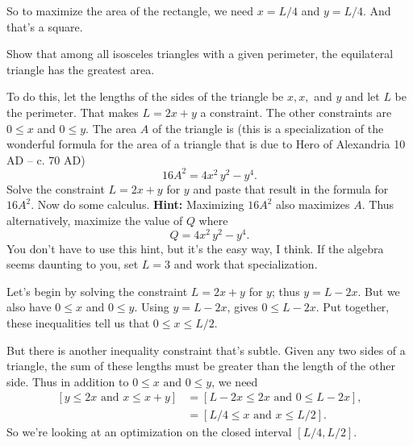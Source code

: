 \documentclass[12pt,fleqn,answers]{exam}
\begin{document}
\begin{questions}
\begin{solution}
     \quad So to maximize the area of the rectangle, we need $x = L/4$ and $y = L/4$. And that's a square.
     
     \end{solution}


    \question [5] Show that among all isosceles triangles with a given
    perimeter, the equilateral triangle has the greatest area.

    \quad To do this, let the lengths of the sides of the triangle be $x,x,$
    and $y$ and let $L$ be the perimeter. That makes $L = 2 x + y$ a
    constraint. The other constraints are $0 \leq x$ and $0 \leq y$.
    The area $A$ of the triangle is (this is a specialization of 
    the wonderful formula for the area of a triangle that is due to Hero of Alexandria 
    10 AD – c. 70 AD)
    \begin{equation*}
        16 {{A}^{2}}=4 {{x}^{2}}\, {{y}^{2}}-{{y}^{4}}.
    \end{equation*}
    Solve the constraint $L = 2 x + y$ for $y$ and paste that
    result in  the formula for $16 A^2$. Now do some calculus.
    \textbf{Hint:} Maximizing $16 A^2$ also maximizes $A$.  Thus
    alternatively, maximize the value of $Q$ where
    \begin{equation*}
        Q =4 {{x}^{2}}\, {{y}^{2}}-{{y}^{4}}.
    \end{equation*}
    You
    don't have to use this hint, but it's the easy way, I think.
    \quad If the algebra seems daunting to you, set $L = 3$ and work
    that specialization. 


   \begin{solution}
   Let's begin by solving the constraint  $L = 2 x + y$ for $y$; thus  $y = L - 2 x$.  
   But we also have $0 \leq x$ and $0 \leq y$.  Using $y = L - 2 x$, gives
   $0 \leq L - 2x$. Put together, these inequalities tell us that
   $0 \leq x \leq L/2$. 

   \quad But there is another inequality constraint that's subtle. 
   Given any two sides of a triangle, the sum of these lengths must
   be greater than the length of the other side. Thus   
   in addition to $0 \leq x  \mbox { and  } 0 \leq y$, we need
   \begin{align*}
     \left [y \leq 2 x \mbox { and  } x  \leq x + y \right ]
     &= \left [  L - 2 x \leq 2 x \mbox { and  }  0 \leq L -  2x  \right ], \\
     &= \left [  L / 4 \leq x  \mbox { and  } x \leq L / 2 \right ]. 
   \end{align*} 
So we're looking at an optimization on the closed interval $[L/4, L/2]$.
   

\end{solution}
\end{questions}
\end{document}
